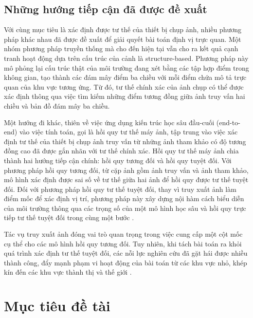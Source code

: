 \subsection{Những hướng tiếp cận đã được đề xuất}

Với cùng mục tiêu là xác định được tư thế của thiết bị chụp ảnh, nhiều phương pháp khác nhau đã được đề xuất để giải quyết bài toán định vị trực quan. Một nhóm phương pháp truyền thống mà cho đến hiện tại vẫn cho ra kết quả cạnh tranh hoạt động dựa trên cấu trúc của cảnh là structure-based. Phương pháp này mô phỏng lại cấu trúc thật của môi trường đang xét bằng các tập hợp điểm trong không gian, tạo thành các đám mây điểm ba chiều với mỗi điểm chứa mô tả trực quan của khu vực tương ứng. Từ đó, tư thế chính xác của ảnh chụp có thể được xác định thông qua việc tìm kiếm những điểm tương đồng giữa ảnh truy vấn hai chiều và bản đồ đám mây ba chiều.

Một hướng đi khác, thiên về việc ứng dụng kiến trúc học sâu đầu-cuối (end-to-end) vào việc tính toán, gọi là hồi quy tư thế máy ảnh, tập trung vào việc xác định tư thế của thiết bị chụp ảnh truy vấn từ những ảnh tham khảo có độ tương đồng cao đã được gắn nhãn với tư thế chính xác. Hồi quy tư thế máy ảnh chia thành hai hướng tiếp cận chính: hồi quy tương đối và hồi quy tuyệt đối. Với phương pháp hồi quy tương đối, từ cặp ảnh gồm ảnh truy vấn và ảnh tham khảo, mô hình xác định được sai số về tư thế giữa hai ảnh \cite{zhou2020learn} để hồi quy được tư thế tuyệt đối. Đối với phương pháp hồi quy tư thế tuyệt đối, thay vì truy xuất ảnh làm điểm mốc để xác định vị trí, phương pháp này xây dựng nội hàm cách biểu diễn của môi trường thông qua các trọng số của một mô hình học sâu và hồi quy trực tiếp tư thế tuyệt đối trong cùng một bước \cite{kendall2016posenet}.

Tác vụ truy xuất ảnh đóng vai trò quan trọng trong việc cung cấp một cột mốc cụ thể cho các mô hình hồi quy tương đối. Tuy nhiên, khi tách bài toán ra khỏi quá trình xác định tư thế tuyệt đối, các nỗi lực nghiên cứu đã gặt hái được nhiều thành công, đẩy mạnh phạm vi hoạt động của bài toán từ các khu vực nhỏ, khép kín đến các khu vực thành thị và thế giới \cite{berton2022rethinking, keetha2023anyloc, alibey2023mixvpr}.

\section{Mục tiêu đề tài}

